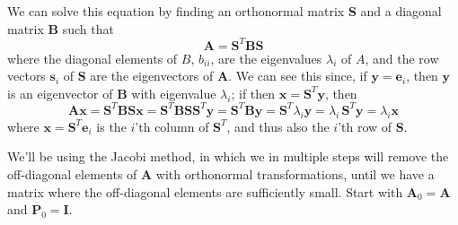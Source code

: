 \documentclass[11pt,a4paper]{article}
\newcommand\V[1]{\mathbf{#1}}                  %
\begin{document}
We can solve this equation by finding an orthonormal matrix $\V{S}$ and a diagonal matrix $\V{B}$
such that
\begin{equation}
  \V{A} = \V{S}^T \V{B} \V{S}
\end{equation}
where the diagonal elements of $B$, $b_{ii}$, are the eigenvalues $\lambda_i$ of $A$, and the row
vectors $\V{s}_i$ of $\V{S}$ are the eigenvectors of $\V{A}$. We can see this since, if $\V{y} = \V{e}_i$, then $\V{y}$ is an eigenvector of $\V{B}$ with eigenvalue $\lambda_i$; if then $\V{x} = \V{S}^T \V{y}$, then
\begin{equation}
  \V{A} \V{x}
    = \V{S}^T \V{B} \V{S} \V{x}
    = \V{S}^T \V{B} \V{S} \V{S}^T \V{y}
    = \V{S}^T \V{B} \V{y}
    = \V{S}^T \lambda_i \V{y}
    = \lambda_i \, \V{S}^T \V{y}
    = \lambda_i \V{x}
\end{equation}
where $\V{x} = \V{S}^T \V{e}_i$ is the $i$'th column of $\V{S}^T$, and thus also the $i$'th row of $\V{S}$.

We'll be using the Jacobi method, in which we in multiple steps will remove the off-diagonal elements
of $\V{A}$ with orthonormal transformations, until we have a matrix where the off-diagonal elements are
sufficiently small. Start with $\V{A}_0 = \V{A}$ and $\V{P}_0 = \V{I}$.
\end{document}

